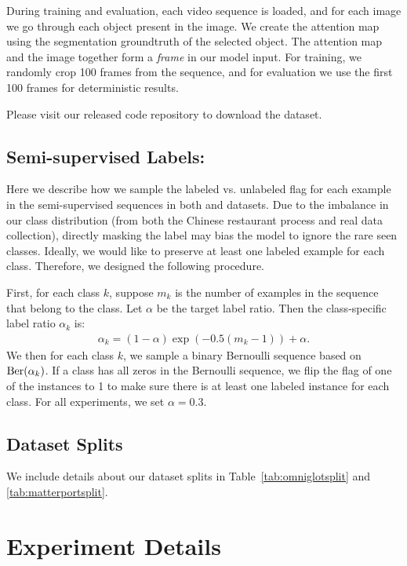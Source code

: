 During training and evaluation, each video sequence is loaded, and for each image we go through each
object present in the image. We create the attention map using the segmentation groundtruth of the
selected object. The attention map and the image together form a \textit{frame} in our model input.
For training, we randomly crop 100 frames from the sequence, and for evaluation we use the first 100
frames for deterministic results.

Please visit our released code repository to download the \ourroom{} dataset.


\subsection{Semi-supervised Labels:}
Here we describe how we sample the labeled vs. unlabeled flag for each example in the
semi-supervised sequences in both \ourchar{} and \ourroom{} datasets. Due to the imbalance in our
class distribution (from both the Chinese restaurant process and real data collection), directly
masking the label may bias the model to ignore the rare seen classes. Ideally, we would like to
preserve at least one labeled example for each class. Therefore, we designed the following
procedure.

First, for each class $k$, suppose $m_k$ is the number of examples in the sequence that belong to
the class. Let $\alpha$ be the target label ratio. Then the class-specific label ratio $\alpha_k$
is:
\begin{align}
\alpha_k = (1 - \alpha) \exp(-0.5 (m_k - 1)) + \alpha.
\label{eq:semisup}
\end{align}
We then for each class $k$, we sample a binary Bernoulli sequence based on $\operatorname*{Ber}(\alpha_k)$. If a
class has all zeros in the Bernoulli sequence, we flip the flag of one of the instances to 1 to make
sure there is at least one labeled instance for each class.
For all experiments, we set $\alpha = 0.3$.

\subsection{Dataset Splits}
We include details about our dataset splits in Table~\ref{tab:omniglotsplit} and
\ref{tab:matterportsplit}.

\section{Experiment Details}
\label{app:exp}
